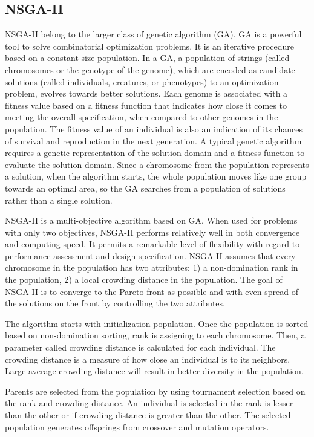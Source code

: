 \documentclass{llncs}
\begin{document}
\subsection{NSGA-II}
NSGA-II \cite{996017} belong to the larger class of genetic algorithm (GA). GA \cite{man1996genetic} is a powerful tool to solve combinatorial optimization problems. It is an iterative procedure based on a constant-size population. In a GA, a population of strings (called chromosomes
or the genotype of the genome), which are encoded as candidate solutions (called individuals, creatures, or phenotypes) to an optimization problem, evolves towards better solutions. 
Each genome is associated with a fitness value based on a fitness function that indicates how close it comes to meeting the overall specification, when compared to other genomes in the
population. The fitness value of an individual is also an indication of its chances of survival and reproduction in the next generation. A typical genetic algorithm requires a genetic
representation of the solution domain and a fitness function to evaluate the solution domain. Since a chromosome from the population represents a solution, when the algorithm starts, 
the whole population moves like one group towards an optimal area, so the GA searches from a population of solutions rather than a single solution.

NSGA-II is a multi-objective algorithm based on GA. When used for problems with only two objectives, NSGA-II performs 
relatively well in both convergence and  computing speed. It permits a remarkable level of flexibility with regard to 
performance assessment and design specification. NSGA-II assumes that every chromosome in the population has two 
attributes: 1) a non-domination rank in the population, 2) a local crowding distance in the population. The goal of 
NSGA-II is to converge to the Pareto front as possible and with even spread of the solutions on the front by 
controlling the two attributes. 

The algorithm starts with initialization population. Once the population is sorted based on non-domination sorting, rank is assigning to each chromosome.
Then, a parameter called crowding distance is calculated for each individual. The crowding distance is a measure of how close an individual is to its neighbors. Large 
average crowding distance will result in better diversity in the population. 

Parents are selected from the population by using tournament selection based on the rank and crowding distance. An individual is selected in the rank is lesser than the other or 
if crowding distance is greater than the other. The selected population generates offsprings from crossover and mutation operators. 
\end{document}
